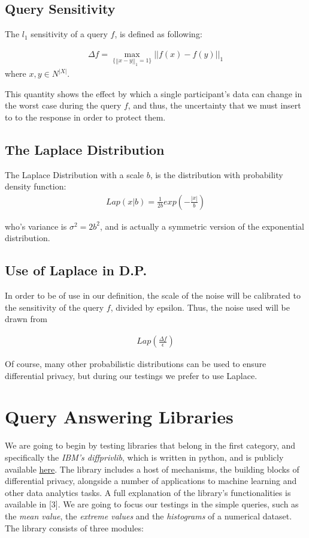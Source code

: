 \subsection{Query Sensitivity}
The $l_1$ sensitivity of a query $f$, is defined as following:

\begin{align*}
    \Delta f = \max_{\{||x-y||_1 = 1\}} ||f(x) - f(y)||_1
\end{align*} where $x,y \in N^{|X|}$.

This quantity shows the effect by which a single participant's data can change in the worst case during the query $f$, and thus, the uncertainty that we must insert to to the response in order to protect them.

\subsection{The Laplace Distribution}
The Laplace Distribution with a scale $b$, is the distribution with probability density function: 
\begin{align*}
Lap(x|b) = \frac{1}{2b}exp(-\frac{|x|}{b})
\end{align*}

who's variance is $\sigma^2 = 2b^2$, and is actually a symmetric version of the exponential distribution.

\subsection{Use of Laplace in D.P.}

In order to be of use in our definition, the scale of the noise will be calibrated to the sensitivity of the query $f$, divided by epsilon. Thus, the noise used will be drawn from

\begin{align*}
Lap(\frac{\Delta f}{\epsilon})
\end{align*}

Of course, many other probabilistic distributions can be used to ensure differential privacy, but during our testings we prefer to use Laplace.

\section{Query Answering Libraries}

We are going to begin by testing libraries that belong in the first category, and specifically the \emph{IBM's diffprivlib}, which is written in python, and is publicly available \href{https://github.com/IBM/differential-privacy-library}{here}. The library includes a host of mechanisms, the building blocks of differential privacy, alongside a number of applications to machine learning and other data analytics tasks. A full explanation of the library's functionalities is available in [3]. We are going to focus our testings in the simple queries, such as the \emph{mean value}, the \emph{extreme values} and the \emph{histograms} of a numerical dataset. The library consists of three modules:

